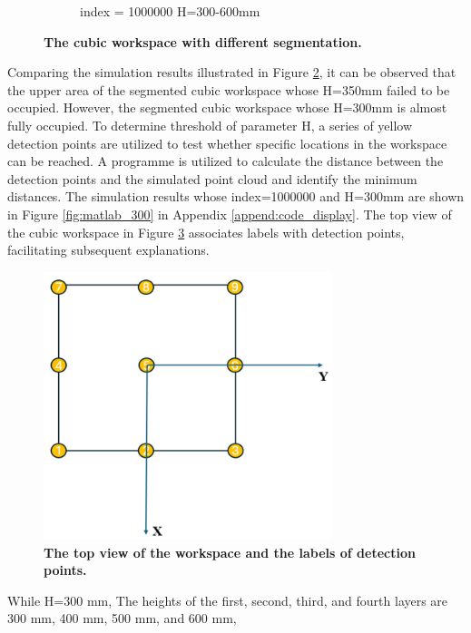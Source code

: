 \begin{figure}[H]
\begin{subfigure}{0.45\textwidth}
        \caption{\centering index = 1000000 H=300-600mm}
        \label{fig:ws_10000_300}
    \end{subfigure}
    \caption[The cubic workspace with different segmentation]
    {\centering \textbf{The cubic workspace with different segmentation.}}
    \label{fig:ws_300_350}
\end{figure}
Comparing the simulation results illustrated in Figure \ref{fig:ws_300_350}, it can be observed that the upper 
area of the segmented cubic workspace whose H=350mm failed to be occupied. However, the segmented cubic workspace 
whose H=300mm is almost fully occupied. To determine threshold of parameter H, a series of yellow detection points 
are utilized to test whether specific locations in the workspace can be reached. A programme is utilized to calculate 
the distance between the detection points and the simulated point cloud and identify the minimum distances. The  
simulation results whose index=1000000 and H=300mm are shown in Figure \ref{fig:matlab_300} in Appendix 
\ref{append:code_display}. The top view of the cubic workspace in Figure \ref{fig:top_view} associates labels with 
detection points, facilitating subsequent explanations. 
\begin{figure}[H] %
    \centering 
    \captionsetup{labelsep=colon}
    \includegraphics[width=0.75\textwidth]{Image/Result/top_view_rect_workspace.png} 
    \caption[The top view of the workspace and the labels of detection points]
    {\centering \textbf{The top view of the workspace and the labels of detection points.}}
    \label{fig:top_view}
\end{figure}
While H=300 mm, The heights of the first, second, third, and fourth layers are 300 mm, 400 mm, 500 mm, and 600 mm, 

